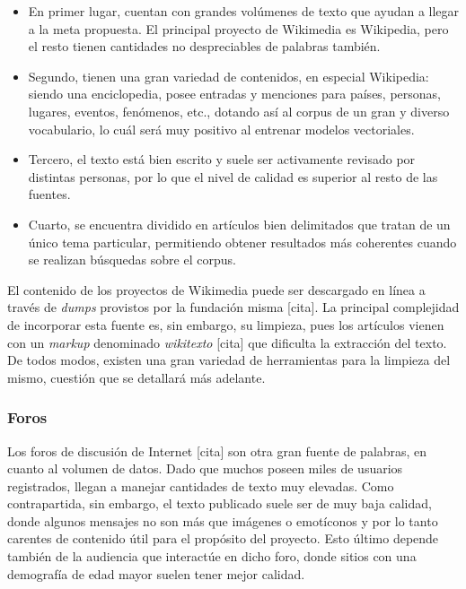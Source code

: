 \begin{itemize}

\item En primer lugar, cuentan con grandes volúmenes de texto que ayudan a llegar a la meta
propuesta. El principal proyecto de Wikimedia es Wikipedia, pero el resto tienen cantidades no
despreciables de palabras también.

\item Segundo, tienen una gran variedad de contenidos, en especial Wikipedia: siendo una
enciclopedia, posee entradas y menciones para países, personas, lugares, eventos, fenómenos, etc.,
dotando así al corpus de un gran y diverso vocabulario, lo cuál será muy positivo al entrenar
modelos vectoriales.

\item Tercero, el texto está bien escrito y suele ser activamente revisado por distintas personas,
por lo que el nivel de calidad es superior al resto de las fuentes.

\item Cuarto, se encuentra dividido en artículos bien delimitados que tratan de un único tema
particular, permitiendo obtener resultados más coherentes cuando se realizan búsquedas sobre el
corpus.

\end{itemize}


El contenido de los proyectos de Wikimedia puede ser descargado en línea a través de \textit{dumps}
provistos por la fundación misma [cita]. La principal complejidad de incorporar esta fuente es, sin
embargo, su limpieza, pues los artículos vienen con un \textit{markup} denominado \textit{wikitexto}
[cita] que dificulta la extracción del texto. De todos modos, existen una gran variedad de
herramientas para la limpieza del mismo, cuestión que se detallará más adelante.


\subsubsection{Foros}

Los foros de discusión de Internet [cita] son otra gran fuente de palabras, en cuanto al volumen de
datos. Dado que muchos poseen miles de usuarios registrados, llegan a manejar cantidades de texto
muy elevadas. Como contrapartida, sin embargo, el texto publicado suele ser de muy baja calidad,
donde algunos mensajes no son más que imágenes o emotíconos y por lo tanto carentes de contenido
útil para el propósito del proyecto. Esto último depende también de la audiencia que interactúe en
dicho foro, donde sitios con una demografía de edad mayor suelen tener mejor calidad.

